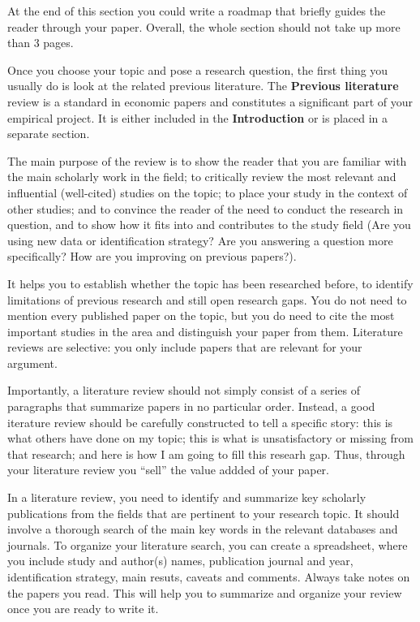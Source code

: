 \documentclass[
]{book}
\begin{document}
At the end of this section you could write a roadmap that briefly guides
the reader through your paper. Overall, the whole section should not
take up more than 3 pages.

Once you choose your topic and pose a research question, the first thing
you usually do is look at the related previous literature. The
\textbf{Previous literature} review is a standard in economic papers and
constitutes a significant part of your empirical project. It is either
included in the \textbf{Introduction} or is placed in a separate
section.

The main purpose of the review is to show the reader that you are
familiar with the main scholarly work in the field; to critically review
the most relevant and influential (well-cited) studies on the topic; to
place your study in the context of other studies; and to convince the
reader of the need to conduct the research in question, and to show how
it fits into and contributes to the study field (Are you using new data
or identification strategy? Are you answering a question more
specifically? How are you improving on previous papers?).

It helps you to establish whether the topic has been researched before,
to identify limitations of previous research and still open research
gaps. You do not need to mention every published paper on the topic, but
you do need to cite the most important studies in the area and
distinguish your paper from them. Literature reviews are selective: you
only include papers that are relevant for your argument.

Importantly, a literature review should not simply consist of a series
of paragraphs that summarize papers in no particular order. Instead, a
good iterature review should be carefully constructed to tell a specific
story: this is what others have done on my topic; this is what is
unsatisfactory or missing from that research; and here is how I am going
to fill this researh gap. Thus, through your literature review you
``sell'' the value addded of your paper.

In a literature review, you need to identify and summarize key scholarly
publications from the fields that are pertinent to your research topic.
It should involve a thorough search of the main key words in the
relevant databases and journals. To organize your literature search, you
can create a spreadsheet, where you include study and author(s) names,
publication journal and year, identification strategy, main resuts,
caveats and comments. Always take notes on the papers you read. This
will help you to summarize and organize your review once you are ready
to write it.
\end{document}
